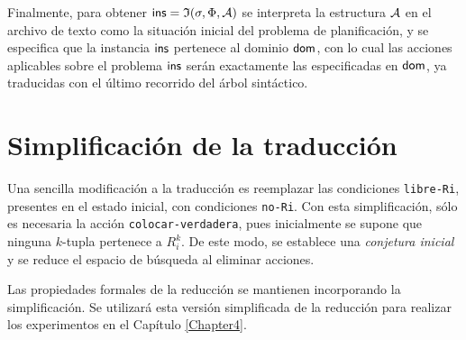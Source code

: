 Finalmente, para obtener $\mathsf{ins}=\mathfrak{I}(\sigma,\Phi,\mathcal{A})$ se interpreta la
estructura $\mathcal{A}$ en el archivo de texto como la situación inicial del problema
de planificación, y se especifica que la instancia $\mathsf{ins}$ pertenece al
dominio $\mathsf{dom}$, con lo cual las acciones aplicables sobre el problema
$\mathsf{ins}$ serán exactamente las especificadas en $\mathsf{dom}$, ya traducidas con
el último recorrido del árbol sintáctico.

\section{Simplificación de la traducción}
Una sencilla modificación a la traducción es reemplazar las
condiciones \texttt{libre-Ri}, presentes en el estado inicial, con
condiciones \texttt{no-Ri}. Con esta simplificación, sólo es necesaria la
acción \texttt{colocar-verdadera}, pues inicialmente se supone que ninguna
$k$-tupla pertenece a $R_i^k$. De este modo, se establece una \textit{conjetura
inicial} y se reduce el espacio de búsqueda al eliminar acciones.

Las propiedades formales de la reducción se mantienen incorporando la
simplificación. Se utilizará esta versión simplificada de la
reducción para realizar los experimentos en el Capítulo \ref{Chapter4}.

%
%
%
